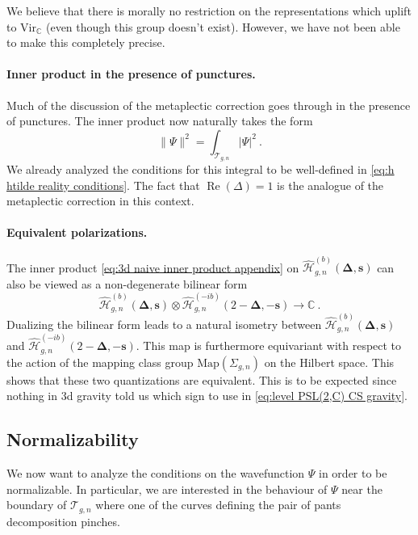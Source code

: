 \documentclass[12pt,a4paper]{article}
\newcommand{\be}{\begin{equation}}
\newcommand{\ee}{\end{equation}}
\renewcommand\Re{\mathop{\text{Re}}}
\newcommand\CC{\mathbb{C}}
\begin{document}
We believe that there is morally no restriction on the representations which uplift to $\text{Vir}_\CC$ (even though this group doesn't exist). However, we have not been able to make this completely precise.

\paragraph{Inner product in the presence of punctures.} Much of the discussion of the metaplectic correction goes through in the presence of punctures. The inner product now naturally takes the form
\be 
\lVert \Psi \rVert^2=\int_{\mathcal{T}_{g,n}} |\Psi|^2~.\label{eq:3d naive inner product appendix}
\ee
We already analyzed the conditions for this integral to be well-defined in \eqref{eq:h htilde reality conditions}. The fact that $\Re(\Delta) = 1$ is the analogue of the metaplectic correction in this context. 

\paragraph{Equivalent polarizations.} The inner product \eqref{eq:3d naive inner product appendix} on $\hat{\mathcal{H}}_{g,n}^{(b)}(\boldsymbol{\Delta},\boldsymbol{s})$ can also be viewed as a non-degenerate bilinear form
\be 
\hat{\mathcal{H}}_{g,n}^{(b)}(\boldsymbol{\Delta},\boldsymbol{s})\otimes \hat{\mathcal{H}}_{g,n}^{(-ib)}(2-\boldsymbol{\Delta},-\boldsymbol{s}) \longrightarrow \CC~.
\ee
Dualizing the bilinear form leads to a natural isometry between $\hat{\mathcal{H}}_{g,n}^{(b)}(\boldsymbol{\Delta},\boldsymbol{s})$ and $\hat{\mathcal{H}}_{g,n}^{(-ib)}(2-\boldsymbol{\Delta},-\boldsymbol{s})$. This map is furthermore equivariant with respect to the action of the mapping class group $\text{Map}(\Sigma_{g,n})$ on the Hilbert space. This shows that these two quantizations are equivalent. This is to be expected since nothing in 3d gravity told us which sign to use in \eqref{eq:level PSL(2,C) CS gravity}.

\subsection{Normalizability}
We now want to analyze the conditions on the wavefunction $\Psi$ in order to be normalizable. In particular, we are interested in the behaviour of $\Psi$ near the boundary of $\mathcal{T}_{g,n}$ where one of the curves defining the pair of pants decomposition pinches.
\end{document}
